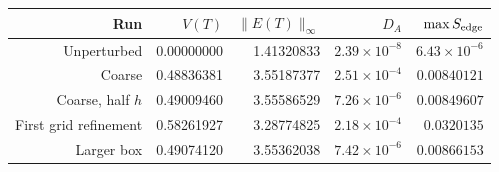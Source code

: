 \begin{tabular}{rrrrr}
\toprule
Run & $V(T)$ & $\|E(T)\|_\infty$ & $D_A$ & $\max S_{\rm edge}$ \\
\midrule
Unperturbed & 0.00000000 & 1.41320833 & $2.39\times10^{-8}$ & $6.43\times10^{-6}$ \\
Coarse & 0.48836381 & 3.55187377 & $2.51\times10^{-4}$ & $0.00840121$ \\
Coarse, half $h$ & 0.49009460 & 3.55586529 & $7.26\times10^{-6}$ & $0.00849607$ \\
First grid refinement & 0.58261927 & 3.28774825 & $2.18\times10^{-4}$ & $0.0320135$ \\
Larger box & 0.49074120 & 3.55362038 & $7.42\times10^{-6}$ & $0.00866153$ \\
\bottomrule
\end{tabular}
